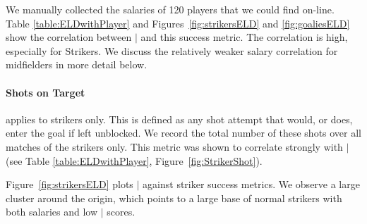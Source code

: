 		We manually collected the salaries of 120 players that we could find on-line. Table \ref{table:ELDwithPlayer}  and Figures~\ref{fig:strikersELD} and \ref{fig:goaliesELD} show the correlation between $\mid$ and this success metric. The correlation is high, especially for Strikers. We discuss the relatively weaker salary correlation for midfielders in more detail below.
		
		\paragraph{Shots on Target} applies to strikers only. This is defined as any shot attempt that would, or does, enter the goal if left unblocked. We record the total number of these shots over all matches of the strikers only. This metric was shown to correlate strongly with $\mid$ (see Table \ref{table:ELDwithPlayer}, Figure~\ref{fig:StrikerShot}).
		
		Figure~\ref{fig:strikersELD} plots $\mid$ against striker success metrics. We observe a large cluster around the origin, which points to a large base of normal strikers with both salaries and low $\mid$ scores. %
		
		
